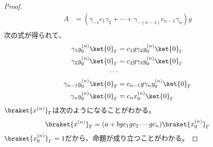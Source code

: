 {\begin{proof}
\begin{equation*}
\begin{split}
			A &= (\gamma_{-1}c_1\gamma_2 + \cdots 
				+ \gamma_{-(n-1)}c_{n-1}\gamma_n)g \\
		\end{split}\end{equation*}
		次の式が得られて、
		\begin{equation*}\begin{split}
			\gamma_1y_0^{(n)}\ket{0}_\Gamma
			&= c_1g\gamma_2y_0^{(n)}\ket{0}_\Gamma \\
			\gamma_2y_0^{(n)}\ket{0}_\Gamma
			&= c_2g\gamma_3y_0^{(n)}\ket{0}_\Gamma \\
			\cdots \\
			\gamma_{n-1}y_0^{(n)}\ket{0}_\Gamma
			&= c_{n-1}g\gamma_ny_0^{(n)}\ket{0}_\Gamma \\
			\gamma_ny_0^{(n)}\ket{0}_\Gamma
			&= c_nx_0^{(n)}\ket{0}_\Gamma \\
		\end{split}\end{equation*}
		$\braket{x^{(n)}}_\Gamma$は次のようになることがわかる。
		\begin{equation*}\begin{split}
			\braket{x^{(n)}}_\Gamma &= (a + bgc_1gc_2\cdots gc_n)
			\braket{x_0^{(n)}}_\Gamma \\
		\end{split}\end{equation*}
		$\braket{x_0^{(n)}}_\Gamma=1$だから、命題が成り立つことがわかる。
	\end{proof} %

}
